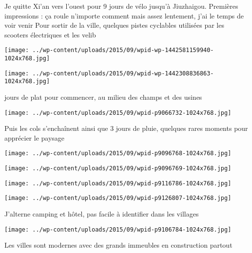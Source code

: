  \newline
 Je quitte Xi'an vers l'ouest pour 9 jours de vélo jusqu'à Jiuzhaigou. Premières impressions : ça roule n'importe comment mais assez lentement, j'ai le temps de voir venir \newline
 Pour sortir de la ville, quelques pistes cyclables utilisées par les scooters électriques et les velib \newline
 \newline
\centerline{\texttt{[image: ../wp-content/uploads/2015/09/wpid-wp-1442581159940-1024x768.jpg]} } 
 \newline
 \newline
\centerline{\texttt{[image: ../wp-content/uploads/2015/09/wpid-wp-1442308836863-1024x768.jpg]} } 
  jours de plat pour commencer, au milieu des champs et des usines \newline
 \newline
\centerline{\texttt{[image: ../wp-content/uploads/2015/09/wpid-p9066732-1024x768.jpg]} } 
 \newline
 Puis les cols s'enchaînent ainsi que 3 jours de pluie, quelques rares moments pour apprécier le paysage \newline
 \newline
\centerline{\texttt{[image: ../wp-content/uploads/2015/09/wpid-p9096768-1024x768.jpg]} } 
 \newline
 \newline
\centerline{\texttt{[image: ../wp-content/uploads/2015/09/wpid-p9096769-1024x768.jpg]} } 
 \newline
 \newline
\centerline{\texttt{[image: ../wp-content/uploads/2015/09/wpid-p9116786-1024x768.jpg]} } 
 \newline
 \newline
\centerline{\texttt{[image: ../wp-content/uploads/2015/09/wpid-p9126807-1024x768.jpg]} } 
 \newline
 J'alterne camping et hôtel, pas facile à identifier dans les villages \newline
 \newline
\centerline{\texttt{[image: ../wp-content/uploads/2015/09/wpid-p9106784-1024x768.jpg]} } 
 \newline
 Les villes sont modernes avec des grands immeubles en construction partout \newline
 \newline
